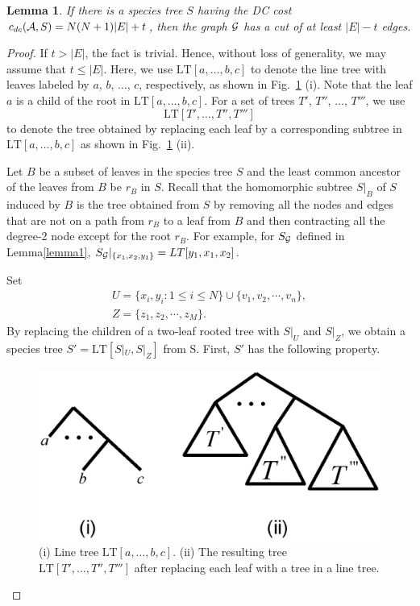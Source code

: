 \documentclass[9.5pt,journal,letterpaper,compsoc]{IEEEtran}
\newtheorem{lemma}{\bf Lemma}[section]
\begin{document}
 \begin{lemma}
\label{lemma2}
    If there is a species tree $S$ having the DC cost
      $c_{dc}({\cal A}, S)=N(N+1)|E| + t$,
         then the graph $\cal G$ has a cut of at least
      $|E|-t$ edges.
 \end{lemma}
\begin{proof}
If $t> |E|$, the fact is trivial. Hence, without loss of generality,
 we may assume that  $t\leq |E|$.
%
 Here,   we use $\mbox{LT}[a,  \ldots, b,  c]$ to denote the line tree
with leaves labeled by $a$, $b$, $\ldots$, $c$, respectively, as
shown in Fig.~\ref{LineTree} (i). Note that the leaf $a$ is a child
of the root in  $\mbox{LT}[a,  \ldots, b, c]$.
 For a set of trees $T'$, $T''$, $\ldots$,  $T'''$,
we use
 $$\mbox{LT}[T', \ldots, T'',  T''']$$
 to denote the tree
obtained by replacing each leaf by a corresponding subtree in
 $\mbox{LT}[a, \ldots, b,  c]$ as shown in Fig.~\ref{LineTree} (ii).

   Let $B$ be a subset of leaves in the species tree $S$ and  the least common
ancestor of the leaves from $B$  be $r_{B}$ in $S$.   Recall that the
   homomorphic subtree $S|_B$ of $S$ induced by $B$ is the tree
   obtained from $S$ by removing all the nodes and edges that are
   not on a path from $r_B$  to a leaf from $B$ and then
   contracting all the degree-2 node except for the root $r_{B}$.
  For example, for $S_{\cal G}$ defined in Lemma\ref{lemma1},
$S_{\cal G}|_{\{x_1, x_2, y_1\}}=\mbox{LT}[y_1, x_1, x_2]$.


   Set
   \begin{eqnarray}
    &  U=\{x_i, y_i :  1\leq i\leq N\} \cup \{v_1, v_2, \cdots, v_n\}, & \nonumber\\
      & Z=\{z_1, z_{2}, \cdots, z_M\}.&
     \end{eqnarray}
   By replacing the children of a two-leaf rooted tree with $S|_{U}$ and
   $S|_{Z}$, we obtain a species tree $S'=\mbox{LT}[S|_{U}, S|_{Z}]$ from S.
 First, $S'$ has the following property.
\vspace{0.5em}

\begin{figure}[t!]
\begin{center}
\includegraphics[width=0.7\columnwidth]{Figure7}
\end{center}
\caption{(i) Line tree $\mbox{LT}[a, \ldots, b, c]$. (ii) The
resulting tree $\mbox{LT}[T', \ldots, T'', T''']$ after replacing
each leaf with a tree in a line tree.} \label{LineTree}
\end{figure}


\end{proof}
\end{document}
